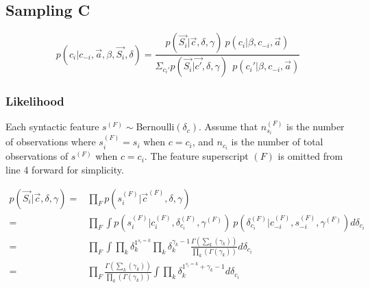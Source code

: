 \documentclass[../main.tex]{subfiles}
\begin{document}
\subsection{Sampling C}
\begin{equation}
p(c_{i}| c_{-i}, \vec{a}, \beta, \vec{S_{i}}, \delta) = \frac{p(\vec{S_{i}}| \vec{c}, \delta, \gamma)\ p(c_{i}|\beta, c_{-i}, \vec{a})}{\Sigma_{c_{i}'}p(\vec{S_{i}}| \vec{c'}, \delta, \gamma)\ \ p(c_{i}'|\beta, c_{-i}, \vec{a})}
\end{equation}

\begin{comment}
\begin{equation}
p(c_{i}| c_{-i}, \vec{a}, \beta, \vec{S_{i}}, \delta, \gamma, l_{i}, \lambda, \eta) = \frac{p(\vec{S_{i}}| \vec{c}, \delta, \gamma)\ p(l_{i} |\vec{c},\lambda, \eta)\ p(c_{i}|\beta, c_{-i}, \vec{a})}{\Sigma_{c_{i}'}p(\vec{S_{i}}| \vec{c'}, \delta, \gamma)\ p(l_{i} |\vec{c'},\lambda, \eta)\ p(c_{i}'|\beta, c_{-i}, \vec{a})}
\end{equation}
\end{comment}
\subsubsection{Likelihood}
Each syntactic feature $s^{(F)}\sim \mbox{Bernoulli}(\delta_{c})$. Assume that $n^{(F)}_{s_{i}}$ is the number of observations where $s^{(F)}_{i}=s_{i}$ when $c=c_{i}$, and $n_{c_{i}}$ is the number of total observations of $s^{(F)}$ when $c=c_{i}$. The feature superscript $(F)$ is omitted from line 4 forward for simplicity.

\begin{equation}
\begin{split}\label{p(s|c)}
p(\vec{S_{i}}| \vec{c}, \delta, \gamma) = & \prod_{F} p(s^{(F)}_{i}|\vec{c}^{(F)}, \delta, \gamma)\\%
= &\prod_{F}\int p(s^{(F)}_{i}|c_{i}^{(F)}, \delta^{(F)}_{c_{i}}, \gamma^{(F)})\ p(\delta^{(F)}_{c_{i}}|c^{(F)}_{-i}, s^{(F)}_{-i},\gamma^{(F)}) d\delta_{c_{i}}\\%
=& \prod_{F}\int \prod_{k} \delta^{1^{s_{i}=k}}_{k}%
\prod_{k} \delta_{k}^{\gamma_{k}-1}  %
\frac{\Gamma(\sum_{k}(\gamma_{k}))}{\prod_{k}(\Gamma(\gamma_{k}))}%
d\delta_{c_{i}} \\ 
=& \prod_{F} \frac{\Gamma(\sum_{k}(\gamma_{k}))}{\prod_{k}(\Gamma(\gamma_{k}))}%
\int \prod_{k}\delta_{k}^{1^{s_{i}=k}+\gamma_{k}-1}d\delta_{c_{i}} %
\end{split}
\end{equation}
\end{document}

